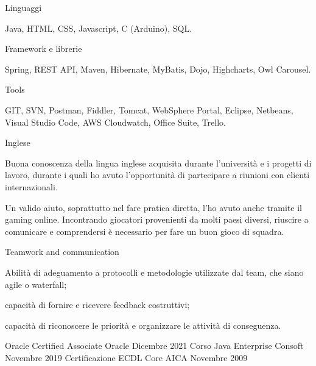 \documentclass[]{style}
\begin{document}
\begin{cventries}
	\cvskillentry
	{Linguaggi}
	{\begin{cventryparagraph}
		\item {Java, HTML, CSS, Javascript, C (Arduino), SQL.}
	\end{cventryparagraph}}
	
	\cvskillentry
	{Framework e librerie}
	{\begin{cventryparagraph}
		\item {Spring, REST API, Maven, Hibernate, MyBatis, Dojo, Highcharts, Owl Carousel.}
	\end{cventryparagraph}}
	
	\cvskillentry
	{Tools}
	{\begin{cventryparagraph}
		\item {GIT, SVN, Postman, Fiddler, Tomcat, WebSphere Portal, Eclipse, Netbeans, Visual Studio Code, AWS Cloudwatch, Office Suite, Trello.}
	\end{cventryparagraph}}
	
	\cvskillentry
	{Inglese}
	{\begin{cventryparagraph}
		\item {Buona conoscenza della lingua inglese acquisita durante l'università e i progetti di lavoro, durante i quali ho avuto l'opportunità di partecipare a riunioni con clienti internazionali.}
		\item {Un valido aiuto, soprattutto nel fare pratica diretta, l'ho avuto anche tramite il gaming online. Incontrando giocatori provenienti da molti paesi diversi, riuscire a comunicare e comprendersi è necessario per fare un buon gioco di squadra.}
	\end{cventryparagraph}}
	
	\cvskillentry
	{Teamwork and communication}
	{\begin{cventryparagraph}
		\item {Abilità di adeguamento a protocolli e metodologie utilizzate dal team, che siano agile o waterfall;}
		\item {capacità di fornire e ricevere feedback costruttivi;}
		\item {capacità di riconoscere le priorità e organizzare le attività di conseguenza.}
	\end{cventryparagraph}}
\end{cventries}

\begin{cvhonors}
	\cvhonor
	{Oracle Certified Associate}
	{}
	{Oracle}
	{Dicembre 2021}
	\cvhonor
	{Corso Java Enterprise}
	{}
	{Consoft}
	{Novembre 2019}
	\cvhonor
	{Certificazione ECDL Core}
	{}
	{AICA}
	{Novembre 2009}
\end{cvhonors}
\end{document}
